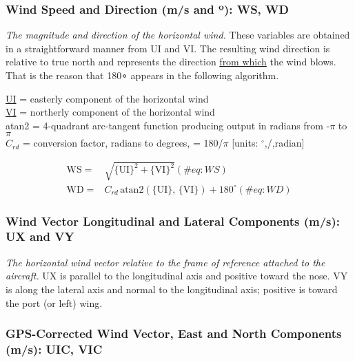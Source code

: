 \documentclass[
  english,
]{book}
\begin{document}
\hypertarget{ws-wd}{%
\subsubsection*{\texorpdfstring{Wind Speed and Direction (m/s and {º}):
WS, WD}{Wind Speed and Direction (m/s and º): WS, WD}}\label{ws-wd}}

\emph{The magnitude and direction of the horizontal wind.} These
variables are obtained in a straightforward manner from UI and VI. The
resulting wind direction is relative to true north and represents the
direction \underline{from which} the wind blows. That is the reason that
180{∘} appears in the following algorithm.

\protect\hyperlink{ui-vi-wi}{UI} = easterly component of the horizontal
wind\\
\protect\hyperlink{ui-vi-wi}{VI} = northerly component of the horizontal
wind\\
atan2 = 4-quadrant arc-tangent function producing output in radians from
-\(\pi\) to \(\pi\)\\
\(C_{rd}\) = conversion factor, radians to degrees, = 180/\(\pi\)
{[}units: \(^{\circ}\),/,radian{]}

\begin{align}
\mathrm{WS} = & \sqrt{\mathrm{\{UI\}}^{2}+\{\mathrm{VI\}}^{2}}(\#eq:WS)\\
\mathrm{WD} = & C_{rd}\mathrm{\,atan2(\{UI\},\,\{VI\})}+180^{\circ}  
(\#eq:WD)
\end{align}

\hypertarget{ux-vy}{%
\subsubsection*{Wind Vector Longitudinal and Lateral Components (m/s):
UX and VY}\label{ux-vy}}

\emph{The horizontal wind} \emph{vector relative to the frame of
reference attached to the aircraft.} UX is parallel to the longitudinal
axis and positive toward the nose. VY is along the lateral axis and
normal to the longitudinal axis; positive is toward the port (or left)
wing.

\hypertarget{uic-vic}{%
\subsubsection*{GPS-Corrected Wind Vector, East and North Components
(m/s): UIC, VIC}\label{uic-vic}}
\end{document}

